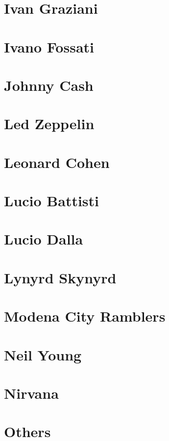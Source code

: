 \chapter{Ivan Graziani}

\chapter{Ivano Fossati}

\chapter{Johnny Cash}

\chapter{Led Zeppelin}

\chapter{Leonard Cohen}

\chapter{Lucio Battisti}

\chapter{Lucio Dalla}

\chapter{Lynyrd Skynyrd}

\chapter{Modena City Ramblers}

\chapter{Neil Young}

\chapter{Nirvana}

\chapter{Others}
